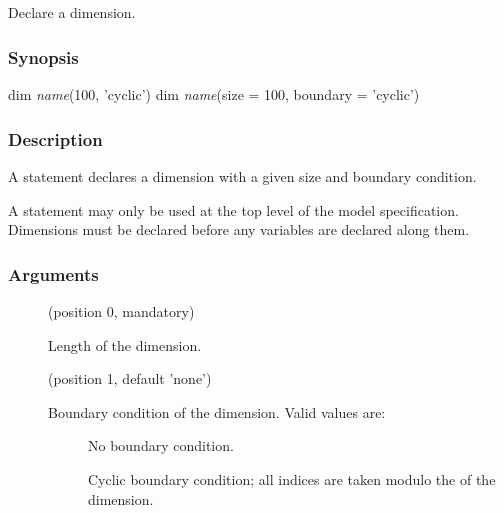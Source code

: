 \subsection{\label{dim}}

Declare a dimension.

\subsubsection*{Synopsis\label{dim_Synopsis}}
\begin{bicode}
    dim \textsl{name}(100, 'cyclic')
    dim \textsl{name}(size = 100, boundary = 'cyclic')
\end{bicode}


\subsubsection*{Description\label{dim_Description}}

A  statement declares a dimension with a given size and boundary
condition.

A  statement may only be used at the top level of the model
specification. Dimensions must be declared before any variables are declared
along them.

\subsubsection*{Arguments\label{dim_Arguments}}

\begin{description}
\item[] (position 0, mandatory)

Length of the dimension.

\item[] (position 1, default 'none')

Boundary condition of the dimension. Valid values are:

\begin{description}
\item[]

No boundary condition.

\item[]

Cyclic boundary condition; all indices are taken modulo the  of
the dimension.
\end{description}
\end{description}

